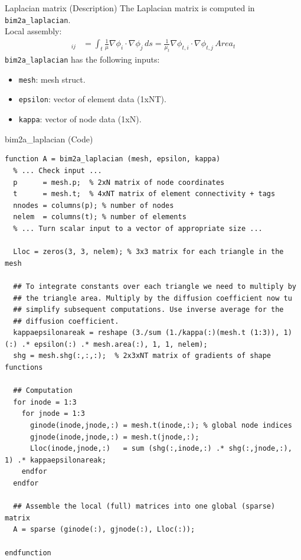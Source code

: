 \documentclass[aspectratio=54,xcolor=dvipsnames]{beamer}
\begin{document}
\begin{frame}{Laplacian matrix (Description)}
    The Laplacian matrix is computed in \texttt{bim2a\_laplacian}. \\
    Local assembly:
    \begin{align*}
        [L^{t}]_{ij} &= \int_{t} \frac{1}{\mu} \nabla \phi_i \cdot \nabla \phi_j \, ds = \frac{1}{\mu_t} \nabla \phi_{t,i} \cdot \nabla \phi_{t,j} \, Area_t
    \end{align*}
    \texttt{bim2a\_laplacian} has the following inputs:
    \begin{itemize}
        \item \texttt{mesh}: mesh struct.
        \item \texttt{epsilon}: vector of element data (1xNT).
        \item \texttt{kappa}: vector of node data (1xN).
    \end{itemize}

\end{frame}

\begin{frame}[fragile]{bim2a\_laplacian (Code)}
\scriptsize
\begin{lstlisting}[firstnumber=41]
function A = bim2a_laplacian (mesh, epsilon, kappa)
  % ... Check input ...
  p      = mesh.p;  % 2xN matrix of node coordinates
  t      = mesh.t;  % 4xNT matrix of element connectivity + tags
  nnodes = columns(p); % number of nodes
  nelem  = columns(t); % number of elements
  % ... Turn scalar input to a vector of appropriate size ...

  Lloc = zeros(3, 3, nelem); % 3x3 matrix for each triangle in the mesh

  ## To integrate constants over each triangle we need to multiply by
  ## the triangle area. Multiply by the diffusion coefficient now tu
  ## simplify subsequent computations. Use inverse average for the
  ## diffusion coefficient.
  kappaepsilonareak = reshape (3./sum (1./kappa(:)(mesh.t (1:3)), 1)(:) .* epsilon(:) .* mesh.area(:), 1, 1, nelem);
  shg = mesh.shg(:,:,:);  % 2x3xNT matrix of gradients of shape functions
  
  ## Computation
  for inode = 1:3
    for jnode = 1:3
      ginode(inode,jnode,:) = mesh.t(inode,:); % global node indices
      gjnode(inode,jnode,:) = mesh.t(jnode,:);
      Lloc(inode,jnode,:)   = sum (shg(:,inode,:) .* shg(:,jnode,:), 1) .* kappaepsilonareak;
    endfor
  endfor

  ## Assemble the local (full) matrices into one global (sparse) matrix
  A = sparse (ginode(:), gjnode(:), Lloc(:));

endfunction
\end{lstlisting}
\end{frame}
\end{document}
